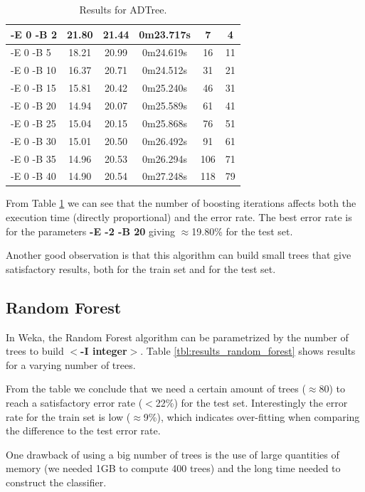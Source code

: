\documentclass[a4paper]{llncs}
\begin{document}
\begin{table}[ht]
\begin{center}
\begin{tabular}{ | l | c | c | c | c | c |}
    -E 0 -B 2 & 21.80 & 21.44 & 0m23.717s & 7 & 4 \\ \hline
    -E 0 -B 5 & 18.21 & 20.99 & 0m24.619s & 16 & 11 \\ \hline
    -E 0 -B 10 & 16.37 & 20.71 & 0m24.512s & 31 & 21 \\ \hline
    -E 0 -B 15 & 15.81 & 20.42 & 0m25.240s & 46 & 31 \\ \hline
    -E 0 -B 20 & 14.94 & 20.07 & 0m25.589s & 61 & 41 \\ \hline
    -E 0 -B 25 & 15.04 & 20.15 & 0m25.868s & 76 & 51 \\ \hline
    -E 0 -B 30 & 15.01 & 20.50 & 0m26.492s & 91 & 61 \\ \hline
    -E 0 -B 35 & 14.96 & 20.53 & 0m26.294s & 106 & 71 \\ \hline
    -E 0 -B 40 & 14.90 & 20.54 & 0m27.248s & 118 & 79 \\ \hline
    
  \end{tabular}
  \caption{Results for ADTree.}
  \label{tbl:results_adtree}
  \end{center}
\end{table}

From Table \ref{tbl:results_adtree} we can see that the number of boosting iterations affects
both the execution time (directly proportional) and the error rate.
The best error rate is for the parameters \textbf{-E -2 -B 20} giving $\approx$19.80\% for the test set.

Another good observation is that this algorithm can build small trees that give satisfactory results, both for
the train set and for the test set.

\subsection{Random Forest}

In Weka, the Random Forest algorithm can be parametrized by the number
of trees to build \textbf{$<$-I integer$>$}. Table \ref{tbl:results_random_forest} shows results for
a varying number of trees.

From the table we conclude that we need a certain amount of trees ($\approx$80) to
reach a satisfactory error rate ($<$22\%) for the test set. Interestingly
the error rate for the train set is low ($\approx$9\%), which indicates over-fitting
when comparing the difference to the test error rate.

One drawback of using a big number of trees is the use of large
quantities of memory (we needed 1GB to compute 400 trees) and the long time needed to construct the classifier.
\end{document}
